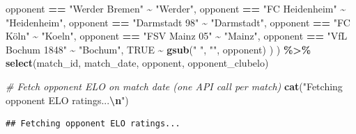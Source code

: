 \documentclass[
]{article}
\newenvironment{Shaded}{\begin{snugshade}}{\end{snugshade}}
\newcommand{\CommentTok}[1]{\textcolor[rgb]{0.56,0.35,0.01}{\textit{#1}}}
\newcommand{\ConstantTok}[1]{\textcolor[rgb]{0.56,0.35,0.01}{#1}}
\newcommand{\FunctionTok}[1]{\textcolor[rgb]{0.13,0.29,0.53}{\textbf{#1}}}
\newcommand{\NormalTok}[1]{#1}
\newcommand{\SpecialCharTok}[1]{\textcolor[rgb]{0.81,0.36,0.00}{\textbf{#1}}}
\newcommand{\StringTok}[1]{\textcolor[rgb]{0.31,0.60,0.02}{#1}}
\begin{document}
\begin{Shaded}
\begin{Highlighting}[]
\NormalTok{      opponent }\SpecialCharTok{==} \StringTok{"Werder Bremen"}             \SpecialCharTok{\textasciitilde{}} \StringTok{"Werder"}\NormalTok{,}
\NormalTok{      opponent }\SpecialCharTok{==} \StringTok{"FC Heidenheim"}             \SpecialCharTok{\textasciitilde{}} \StringTok{"Heidenheim"}\NormalTok{,}
\NormalTok{      opponent }\SpecialCharTok{==} \StringTok{"Darmstadt 98"}              \SpecialCharTok{\textasciitilde{}} \StringTok{"Darmstadt"}\NormalTok{,}
\NormalTok{      opponent }\SpecialCharTok{==} \StringTok{"FC Köln"}                   \SpecialCharTok{\textasciitilde{}} \StringTok{"Koeln"}\NormalTok{,}
\NormalTok{      opponent }\SpecialCharTok{==} \StringTok{"FSV Mainz 05"}              \SpecialCharTok{\textasciitilde{}} \StringTok{"Mainz"}\NormalTok{,}
\NormalTok{      opponent }\SpecialCharTok{==} \StringTok{"VfL Bochum 1848"}           \SpecialCharTok{\textasciitilde{}} \StringTok{"Bochum"}\NormalTok{,}
      \ConstantTok{TRUE} \SpecialCharTok{\textasciitilde{}} \FunctionTok{gsub}\NormalTok{(}\StringTok{" "}\NormalTok{, }\StringTok{""}\NormalTok{, opponent)}
\NormalTok{    )}
\NormalTok{  ) }\SpecialCharTok{\%\textgreater{}\%}
  \FunctionTok{select}\NormalTok{(match\_id, match\_date, opponent, opponent\_clubelo)}

\CommentTok{\# Fetch opponent ELO on match date (one API call per match)}
\FunctionTok{cat}\NormalTok{(}\StringTok{"Fetching opponent ELO ratings...}\SpecialCharTok{\textbackslash{}n}\StringTok{"}\NormalTok{)}
\end{Highlighting}
\end{Shaded}

\begin{verbatim}
## Fetching opponent ELO ratings...
\end{verbatim}
\end{document}
